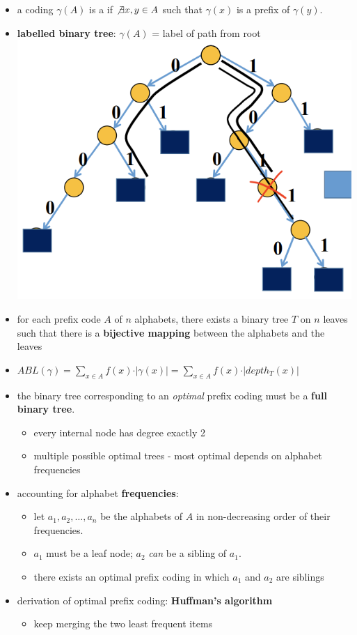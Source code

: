 \documentclass[10pt, landscape]{article}
\begin{document}
\begin{multicols*}{4}
  \begin{itemize}
    \item a coding $\gamma(A)$ is a  if $\not\exists x, y \in A$ such that $\gamma(x)$ is a prefix of $\gamma(y)$.
    \item \textbf{labelled binary tree}: $\gamma(A)$ = label of path from root
      \includegraphics[width=0.6\linewidth]{cs3230-prefix-coding-binary-tree.png} 
    \item for each prefix code $A$ of $n$ alphabets, there exists a binary tree $T$ on $n$ leaves such that there is a \textbf{bijective mapping} between the alphabets and the leaves
    \item $ABL(\gamma) = \sum\limits_{x \in A} f(x) \cdot \vert \gamma(x) \vert = \sum\limits_{x \in A} f(x) \cdot \vert depth_T (x) \vert$
    \item the binary tree corresponding to an \textit{optimal} prefix coding must be a \textbf{full binary tree}.
      \begin{itemize}
        \item every internal node has degree exactly 2
        \item multiple possible optimal trees - most optimal depends on alphabet frequencies
      \end{itemize}
    \item accounting for alphabet \textbf{frequencies}:
      \begin{itemize}
        \item let $a_1, a_2, \dots, a_n$ be the alphabets of $A$ in non-decreasing order of their frequencies.
        \item $a_1$ must be a leaf node; $a_2$ \textit{can} be a sibling of $a_1$.
        \item there exists an optimal prefix coding in which $a_1$ and $a_2$ are siblings
      \end{itemize}
    \item derivation of optimal prefix coding: \textbf{Huffman's algorithm}
      \begin{itemize}
        \item keep merging the two least frequent items
      \end{itemize}
  \end{itemize}


\end{multicols*}
\end{document}

